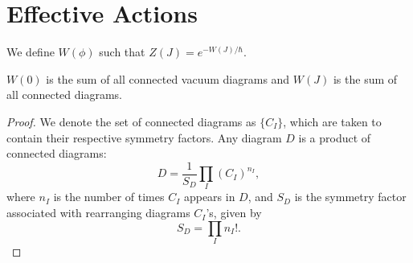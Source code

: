 \section{Effective Actions}%
\label{sec:effective_actions}

\begin{definition}
  We define $W(\phi)$ such that $ Z(J) = e^{-W (J) / \hbar}$.
\end{definition}

\begin{claim}
  $W(0)$ is the sum of all connected vacuum diagrams and $W(J)$ is the sum of all connected diagrams.
\end{claim}
\begin{proof}
  We denote the set of connected diagrams as $\{C_I\}$, which are taken to contain their respective symmetry factors.
  Any diagram $D$ is a product of connected diagrams:
  \begin{equation}
    D = \frac{1}{S_D} \prod_I (C_I)^{n_I},
  \end{equation}
  where $n_I$ is the number of times $C_I$ appears in $D$, and  $S_D$  is the symmetry factor associated with rearranging diagrams $C_I$'s, given by
  \begin{equation}
    S_D = \prod_{I} n_I!.
  \end{equation}


\end{proof}
